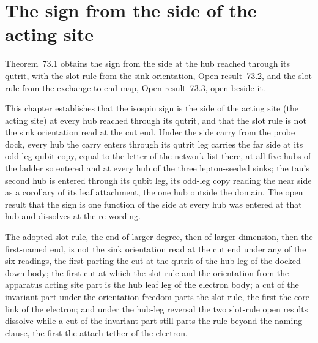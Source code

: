 \par\medskip{}\label{narr:close:4-4}\par
\section{The sign from the side of the acting site}\label{mod:IV-5-sign-from-the-side-of-the-acting-site}
\label{narr:open:4-5}Theorem~73.1 obtains the sign from the side at the hub reached through its qutrit, with the slot rule from the sink orientation, Open result~73.2, and the slot rule from the exchange-to-end map, Open result~73.3, open beside it.
\begin{chtheorem}\label{box:IV-5-sign-from-the-side-of-the-acting-site:1}
This chapter establishes that the isospin sign is the side of the acting site (the acting site) at every hub reached through its qutrit, and that the slot rule is not the sink orientation read at the cut end. Under the side carry from the probe dock, every hub the carry enters through its qutrit leg carries the far side at its odd-leg qubit copy, equal to the letter of the network list there, at all five hubs of the ladder so entered and at every hub of the three lepton-seeded sinks; the tau's second hub is entered through its qubit leg, its odd-leg copy reading the near side as a corollary of its leaf attachment, the one hub outside the domain. The open result that the sign is one function of the side at every hub was entered at that hub and dissolves at the re-wording.
\end{chtheorem}
\begin{chwall}\label{box:IV-5-sign-from-the-side-of-the-acting-site:2}
The adopted slot rule, the end of larger degree, then of larger dimension, then the first-named end, is not the sink orientation read at the cut end under any of the six readings, the first parting the cut at the qutrit of the hub leg of the docked down body; the first cut at which the slot rule and the orientation from the apparatus acting site part is the hub leaf leg of the electron body; a cut of the invariant part under the orientation freedom parts the slot rule, the first the core link of the electron; and under the hub-leg reversal the two slot-rule open results dissolve while a cut of the invariant part still parts the rule beyond the naming clause, the first the attach tether of the electron.
\end{chwall}
